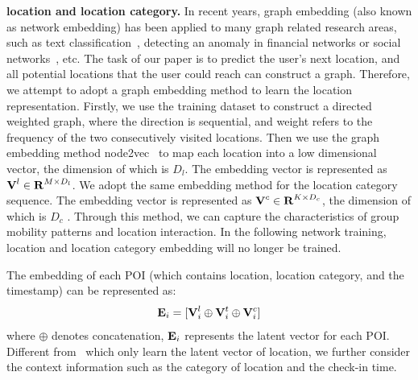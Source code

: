 \documentclass[10pt,journal,compsoc]{IEEEtran}
\begin{document}


\textbf{location and location category.} In recent years, graph embedding (also known as network embedding) has been applied to many graph related research areas, such as text classification~\cite{lu2020vgcn}, detecting an anomaly in financial networks or social networks~\cite{khazane2019deeptrax,ding2019deep}, etc. The task of our paper is to predict the user's next location, and all potential locations that the user could reach can construct a graph. Therefore, we attempt to adopt a graph embedding method to learn the location representation. Firstly, we use the training dataset to construct a directed weighted graph, where the direction is sequential, and weight refers to the frequency of the two consecutively visited locations. Then we use the graph embedding method node2vec~\cite{grover2016node2vec} to map each location into a low dimensional vector, the dimension of which is $D_l$. The embedding vector is represented as $\bm{{\rm V}}^l\in{\bm{{\rm R}}^{M\times{D_l}}}$. We adopt the same embedding method for the location category sequence. The embedding vector is represented as $\bm{{\rm V}}^c\in{\bm{{\rm R}}^{K\times{D_c}}}$, the dimension of which is $D_c$ . Through this method, we can capture the characteristics of group mobility patterns and location interaction. In the following network training, location and location category embedding will no longer be trained.

The embedding of each POI (which contains location, location category, and the timestamp) can be represented as:
\begin{equation}
    \bm{{\rm E}}_i = [\bm{{\rm V}}_{i}^l\oplus{\bm{{\rm V}}_{i}^t}\oplus{\bm{{\rm V}}_{i}^c}]
\end{equation}
where $\oplus{}$ denotes concatenation, $\bm{{\rm E}}_i$ represents the latent vector for each POI. Different from~\cite{feng2018deepmove,sun2020go} which only learn the latent vector of location, we further consider the context information such as the category of location and the check-in time.
\end{document}

